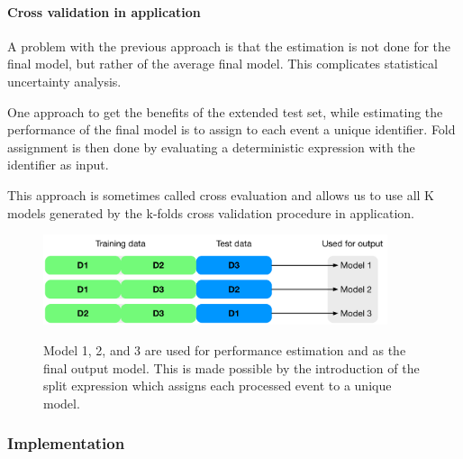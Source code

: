 \paragraph{Cross validation in application}
A problem with the previous approach is that the estimation is not done for the final model, but rather of the average final model. This complicates statistical uncertainty analysis.

One approach to get the benefits of the extended test set, while estimating the performance of the final model is to assign to each event a unique identifier. Fold assignment is then done by evaluating a deterministic expression with the identifier as input.

This approach is sometimes called cross evaluation and allows us to use all K models generated by the k-folds cross validation procedure in application. 

\begin{figure}
\begin{center}
   \includegraphics[width=0.9\textwidth]{plots/cv/cv-workflows-ce}
   \label{fig:workflow1}
   \caption{Model 1, 2, and 3 are used for performance estimation and as the final output model. This is made possible by the introduction of the split expression which assigns each processed event to a unique model.}
\end{center}
\end{figure}











\subsubsection{Implementation}



